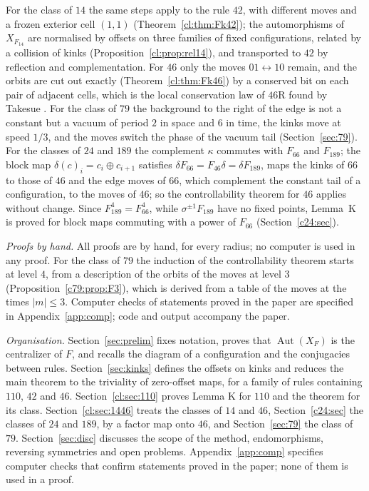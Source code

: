 \documentclass[11pt]{amsart}
\theoremstyle{definition}
\theoremstyle{remark}
\theoremstyle{plain}
\newcommand{\Aut}{\operatorname{Aut}}
\newcommand{\sh}{\sigma}
\begin{document}
For the class of $14$ the same steps apply to the rule $42$, with different moves and a frozen exterior cell $(1,1)$ (Theorem~\ref{cl:thm:Fk42}); the automorphisms of $X_{F_{14}}$ are normalised by offsets on three families of fixed configurations, related by a collision of kinks (Proposition~\ref{cl:prop:rel14}), and transported to $42$ by reflection and complementation. For $46$ only the moves $01\leftrightarrow10$ remain, and the orbits are cut out exactly (Theorem~\ref{cl:thm:Fk46}) by a conserved bit on each pair of adjacent cells, which is the local conservation law of $46$R found by Takesue \cite[(4.4)--(4.6)]{Takesue1989}. For the class of $79$ the background to the right of the edge is not a constant but a vacuum of period $2$ in space and $6$ in time, the kinks move at speed $1/3$, and the moves switch the phase of the vacuum tail (Section~\ref{sec:79}). For the classes of $24$ and $189$ the complement $\kappa$ commutes with $F_{66}$ and $F_{189}$; the block map $\delta(c)_i=c_i\oplus c_{i+1}$ satisfies $\delta F_{66}=F_{46}\delta=\delta F_{189}$, maps the kinks of $66$ to those of $46$ and the edge moves of $66$, which complement the constant tail of a configuration, to the moves of $46$; so the controllability theorem for $46$ applies without change. Since $F_{189}^4=F_{66}^4$, while $\sh^{\pm1}F_{189}$ have no fixed points, Lemma~K is proved for block maps commuting with a power of $F_{66}$ (Section~\ref{c24:sec}).

\emph{Proofs by hand.} All proofs are by hand, for every radius; no computer is used in any proof. For the class of $79$ the induction of the controllability theorem starts at level $4$, from a description of the orbits of the moves at level $3$ (Proposition~\ref{c79:prop:F3}), which is derived from a table of the moves at the times $|m|\le3$. Computer checks of statements proved in the paper are specified in Appendix~\ref{app:comp}; code and output accompany the paper.

\emph{Organisation.} Section~\ref{sec:prelim} fixes notation, proves that $\Aut(X_F)$ is the centralizer of $F$, and recalls the diagram of a configuration and the conjugacies between rules. Section~\ref{sec:kinks} defines the offsets on kinks and reduces the main theorem to the triviality of zero-offset maps, for a family of rules containing $110$, $42$ and $46$. Section~\ref{cl:sec:110} proves Lemma K for $110$ and the theorem for its class. Section~\ref{cl:sec:1446} treats the classes of $14$ and $46$, Section~\ref{c24:sec} the classes of $24$ and $189$, by a factor map onto $46$, and Section~\ref{sec:79} the class of $79$. Section~\ref{sec:disc} discusses the scope of the method, endomorphisms, reversing symmetries and open problems. Appendix~\ref{app:comp} specifies computer checks that confirm statements proved in the paper; none of them is used in a proof.
\end{document}
